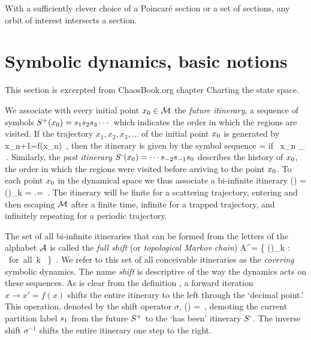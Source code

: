 With a sufficiently clever choice of a Poincar\'e section
or a set of sections,
any orbit of interest intersects a section.

\section{Symbolic dynamics, basic notions}
\label{s-SymbDynDefs}

This section is excerpted from ChaosBook.org
chapter
{Charting the state space}.

We associate with every  initial point ${x_0} \in {\cal M}$
the {\em future itinerary},
a sequence of symbols
$S^\textrm{\scriptsize +}({x_0})={s_{1}} {s_{2}} {s_{3}} \cdots$
which indicates the order in which the regions are visited.
If the trajectory $x_1,  x_2,  x_3,  \ldots$
of the initial point ${x_0}$ is generated by
\beq
   x_{n+1}=f(x_n)
\,,
then the itinerary is given by the symbol sequence
\beq
    = \Ssym{} \qquad \mbox{if\ } \qquad  x_n \in \pS_{\Ssym{}}
 \,.
Similarly, the {\em past itinerary}
$\Spast(\xInit)=\cdots\Ssym{-2} \Ssym{-1} \Ssym{0} $
describes the history of $\xInit$, the order in which
the regions were visited before arriving to the point $\xInit$.
To each point $\xInit$ in the dynamical space we thus associate
a bi-infinite itinerary
\beq
\Sbiinf(\xInit) = ()_{k\in \integers}
        = \Spast.\Sfuture  =
\,.
\label{biifs}
\eeq
The itinerary will be finite for a scattering trajectory,
entering and then escaping ${\cal M}$ after a finite time,
infinite for a trapped trajectory,
and infinitely repeating for a periodic trajectory.

The set of all bi-infinite itineraries that can be formed from the
letters of the alphabet ${\cal A}$ is called the
{\em full shift} (or {\em topological Markov chain})
\beq
{\cal A}^\integers = \{ ()_{k\in \integers}
              :   \mbox{~for all k~} \in  \integers \}
\,.
We refer to this set of all conceivable itineraries
as the {\em covering} symbolic dynamics.
The name {\em shift} is descriptive of the way
the dynamics acts on these sequences.
As is clear from the definition ,
a forward iteration $x\rightarrow x' = f(x)$ shifts the
entire itinerary to the left through the `decimal point.'
This operation, denoted by the shift operator $\sigma$,
\beq
   \sigma()
     =  
\,,
\label{e-shift-s}
\eeq
demoting the current partition label ${s_{1}}$
from the future $S^\textrm{\scriptsize +}$ to the `has been' itinerary $S^\textrm{-}$.
The inverse shift $\sigma^{-1}$ shifts the entire itinerary one step
to the right.

